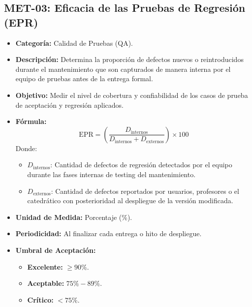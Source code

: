 \documentclass[12pt]{article}
\begin{document}
\newpage

\subsection{MET-03: Eficacia de las Pruebas de Regresión (EPR)}
\label{subsec:met03}

\begin{itemize}
    \item \textbf{Categoría:} Calidad de Pruebas (QA).
    \item \textbf{Descripción:} Determina la proporción de defectos nuevos o reintroducidos durante el mantenimiento que son capturados de manera interna por el equipo de pruebas antes de la entrega formal.
    \item \textbf{Objetivo:} Medir el nivel de cobertura y confiabilidad de los casos de prueba de aceptación y regresión aplicados.
    \item \textbf{Fórmula:}
    \begin{equation}
        \text{EPR} = \left( \frac{D_{\text{internos}}}{D_{\text{internos}} + D_{\text{externos}}} \right) \times 100
    \end{equation}
    Donde:
    \begin{itemize}
        \item $D_{\text{internos}}$: Cantidad de defectos de regresión detectados por el equipo durante las fases internas de testing del mantenimiento.
        \item $D_{\text{externos}}$: Cantidad de defectos reportados por usuarios, profesores o el catedrático con posterioridad al despliegue de la versión modificada.
    \end{itemize}
    \item \textbf{Unidad de Medida:} Porcentaje (\%).
    \item \textbf{Periodicidad:} Al finalizar cada entrega o hito de despliegue.
    \item \textbf{Umbral de Aceptación:} 
    \begin{itemize}
        \item \textcolor{process}{\textbf{Excelente:}} $\ge 90\%$.
        \item \textcolor{value}{\textbf{Aceptable:}} $75\% - 89\%$.
        \item \textcolor{accentred}{\textbf{Crítico:}} $< 75\%$.
    \end{itemize}
\end{itemize}

\vspace{1.5em}
\end{document}

